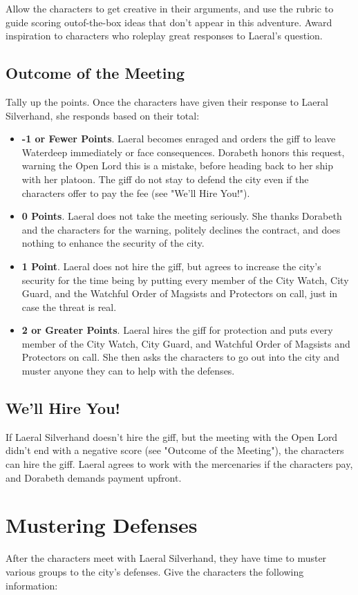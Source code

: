\documentclass[10pt,a4paper,twoside,bg=print,twocolumn,openany,nodeprecatedcode]{dndbook}
\begin{document}
Allow the characters to get creative in their arguments, and use the rubric to guide scoring outof-the-box ideas that don't appear in this adventure. Award inspiration to characters who roleplay great responses to Laeral's question.

\subsection{Outcome of the Meeting}
Tally up the points. Once the characters have given their response to Laeral Silverhand, she responds based on their total:


\begin{itemize}
\item \textbf{-1 or Fewer Points}. Laeral becomes enraged and orders the giff to leave Waterdeep immediately or face consequences. Dorabeth honors this request, warning the Open Lord this is a mistake, before heading back to her ship with her platoon. The giff do not stay to defend the city even if the characters offer to pay the fee (see "We'll Hire You!").
\item \textbf{0 Points}. Laeral does not take the meeting seriously. She thanks Dorabeth and the characters for the warning, politely declines the contract, and does nothing to enhance the security of the city.
\item \textbf{1 Point}. Laeral does not hire the giff, but agrees to increase the city's security for the time being by putting every member of the City Watch, City Guard, and the Watchful Order of Magsists and Protectors on call, just in case the threat is real.
\item \textbf{2 or Greater Points}. Laeral hires the giff for protection and puts every member of the City Watch, City Guard, and Watchful Order of Magsists and Protectors on call. She then asks the characters to go out into the city and muster anyone they can to help with the defenses.
\end{itemize}

\subsection{We'll Hire You!}
If Laeral Silverhand doesn't hire the giff, but the meeting with the Open Lord didn't end with a negative score (see "Outcome of the Meeting"), the characters can hire the giff. Laeral agrees to work with the mercenaries if the characters pay, and Dorabeth demands payment upfront.

\section{Mustering Defenses}
After the characters meet with Laeral Silverhand, they have time to muster various groups to the city's defenses. Give the characters the following information:
\end{document}
